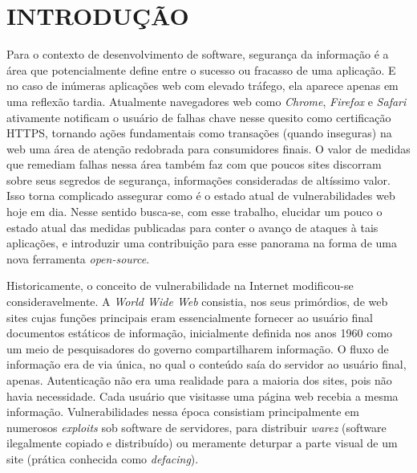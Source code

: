 \chapter{INTRODUÇÃO}

Para o contexto de desenvolvimento de software, segurança da informação é a área que potencialmente define entre o sucesso ou fracasso de uma aplicação. E no caso de inúmeras aplicações web com elevado tráfego, ela aparece apenas em uma reflexão tardia. Atualmente navegadores web como \textit{Chrome}, \textit{Firefox} e \textit{Safari} ativamente notificam o usuário de falhas chave nesse quesito como certificação HTTPS, tornando ações fundamentais como transações (quando inseguras) na web uma área de atenção redobrada para consumidores finais. O valor de medidas que remediam falhas nessa área também faz com que poucos sites discorram sobre seus segredos de segurança, informações consideradas de altíssimo valor. Isso torna complicado assegurar como é o estado atual de vulnerabilidades web hoje em dia. Nesse sentido busca-se, com esse trabalho, elucidar um pouco o estado atual das medidas publicadas para conter o avanço de ataques à tais aplicações, e introduzir uma contribuição para esse panorama na forma de uma nova ferramenta \textit{open-source}.

Historicamente, o conceito de vulnerabilidade na Internet modificou-se consideravelmente. A \textit{World Wide Web} consistia, nos seus primórdios, de web sites cujas funções principais eram essencialmente fornecer ao usuário final documentos estáticos de informação, inicialmente definida nos anos 1960 como um meio de pesquisadores do governo compartilharem informação. O fluxo de informação era de via única, no qual o conteúdo saía do servidor ao usuário final, apenas. Autenticação não era uma realidade para a maioria dos sites, pois não havia necessidade. Cada usuário que visitasse uma página web recebia a mesma informação. \cite{stuttard_web_nodate} Vulnerabilidades nessa época consistiam principalmente em numerosos \textit{exploits} sob software de servidores, para distribuir \textit{warez} (software ilegalmente copiado e distribuído) ou meramente deturpar a parte visual de um site (prática conhecida como \textit{defacing}).

